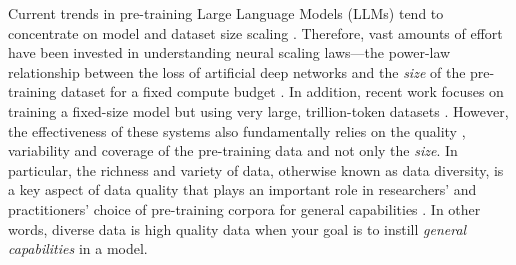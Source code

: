 \documentclass[10pt]{article} %
\begin{document}
\label{introduction}
Current trends in pre-training Large Language Models (LLMs) tend to concentrate on model and dataset size scaling \cite{chowdhery2022palm, nostalgebraist2022chinchilla, gpt4, google2023palm2}.
Therefore, vast amounts of effort have been invested in understanding neural scaling laws---the power-law relationship between the loss of artificial deep networks and the \textit{size} of the pre-training dataset for a fixed compute budget \citep{hestness2017deep,rosenfeld2019constructive,henighan2020scaling,kaplan2020scaling,gordon2021data,hernandez2021scaling,jones2021scaling,zhai2022scaling,hoffmann2022training, clark2022unified, neumann2022scaling}.
In addition, recent work focuses on training a fixed-size model but using very large, trillion-token datasets \citep{llama, llamav2}.
However, the effectiveness of these systems also fundamentally relies on the quality \cite{longpre2023pretrainer}, variability and coverage of the pre-training data \cite{tatsu, david2010impossibility} and not only the \textit{size}. 
In particular, the richness and variety of data, otherwise known as data diversity, is a key aspect of data quality that plays an important role in researchers' and practitioners' choice of pre-training corpora for general capabilities \citep{thepile, gpt3, llama, eldan2023tinystories, gunasekar2023textbooks}. 
In other words, diverse data is high quality data when your goal is to instill \textit{general capabilities} in a model. 



\end{document}
